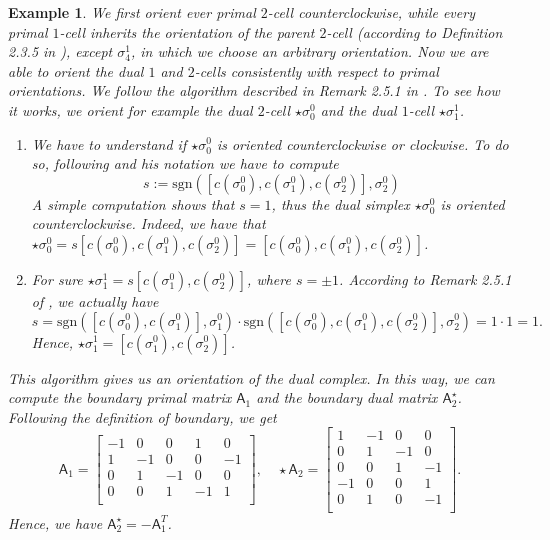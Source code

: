 \documentclass{article}
\theoremstyle{definition} %
\theoremstyle{plain} %
\newtheorem{Ex}[Th]{Example}
\theoremstyle{remark} %
\begin{document}
\begin{Ex}
    We first orient ever primal $2$-cell counterclockwise, while every primal $1$-cell inherits the orientation of the parent $2$-cell (according to Definition 2.3.5 in \cite{hirani2003discrete}), except $\sigma^1_4$, in which we choose an arbitrary orientation. Now we are able to orient the dual $1$ and $2$-cells \textsl{consistently} with respect to primal orientations. We follow the algorithm described in Remark 2.5.1 in \cite{hirani2003discrete}. To see how it works, we orient for example the dual $2$-cell $\star \sigma^0_0$ and the dual $1$-cell $\star \sigma^1_1$. 
    \begin{enumerate}
        \item We have to understand if $\star \sigma^0_0$ is oriented counterclockwise or clockwise. To do so, following \cite{hirani2003discrete} and his notation we have to compute $$s := \text{sgn}([c(\sigma^0_0), c(\sigma^0_1), c(\sigma^0_2)], \sigma^0_2)$$
        A simple computation shows that $s = 1$, thus the dual simplex $\star \sigma^0_0$ is oriented counterclockwise. Indeed, we have that $\star \sigma^0_0 = s [c(\sigma^0_0), c(\sigma^0_1), c(\sigma^0_2)] = [c(\sigma^0_0), c(\sigma^0_1), c(\sigma^0_2)]$.
        \item For sure $\star \sigma_1^1 = s [c(\sigma^0_1), c(\sigma^0_2)]$, where $s = \pm 1$. According to Remark 2.5.1 of \cite{hirani2003discrete}, we actually have
        $$s = \text{sgn}([c(\sigma^0_0), c(\sigma^0_1)], \sigma^0_1) \cdot \text{sgn}([c(\sigma^0_0), c(\sigma^0_1), c(\sigma^0_2)], \sigma^0_2) = 1\cdot 1 = 1.$$
        Hence, $\star \sigma^1_1 = [c(\sigma^0_1), c(\sigma^0_2)]$.
    \end{enumerate}
    This algorithm gives us an orientation of the dual complex. In this way, we can compute the boundary primal matrix $\mathsf{A}_1$ and the boundary dual matrix $\mathsf{A}^\star_2$. Following the definition of boundary, we get
    \begin{equation*}
        \mathsf{A}_1 = \begin{bmatrix}
            -1 & 0 & 0 & 1 & 0\\
            1 & -1 & 0 & 0 & -1\\
            0 & 1 & -1 & 0 & 0\\
            0 & 0 & 1 & -1 & 1\\
        \end{bmatrix}, \quad 
        \star \mathsf{A}_2 = \begin{bmatrix}
            1 & -1 & 0& 0\\
            0 & 1 & -1 & 0\\
            0 & 0 & 1 & -1\\
            -1 & 0 & 0 & 1\\
            0 & 1 & 0 & -1\\
        \end{bmatrix}.
    \end{equation*}
    Hence, we have $ \mathsf{A}^\star_2 = - \mathsf{A}^T_1$.
    
\end{Ex}
\end{document}
